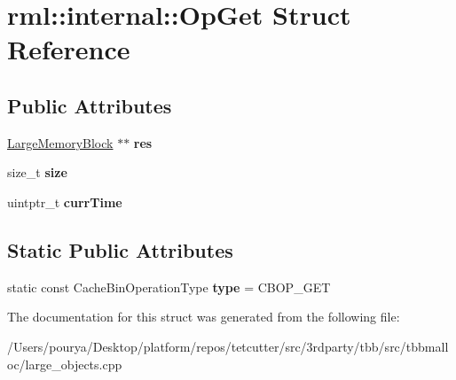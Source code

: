 \hypertarget{structrml_1_1internal_1_1OpGet}{}\section{rml\+:\+:internal\+:\+:Op\+Get Struct Reference}
\label{structrml_1_1internal_1_1OpGet}
\subsection*{Public Attributes}
\begin{DoxyCompactItemize}
\item 
\hypertarget{structrml_1_1internal_1_1OpGet_a28900220e993772d0903734d563a1f3b}{}\hyperlink{structrml_1_1internal_1_1LargeMemoryBlock}{Large\+Memory\+Block} $\ast$$\ast$ {\bfseries res}\label{structrml_1_1internal_1_1OpGet_a28900220e993772d0903734d563a1f3b}

\item 
\hypertarget{structrml_1_1internal_1_1OpGet_a945bece83e743a49829ae81200704df7}{}size\+\_\+t {\bfseries size}\label{structrml_1_1internal_1_1OpGet_a945bece83e743a49829ae81200704df7}

\item 
\hypertarget{structrml_1_1internal_1_1OpGet_a11c9a90f605147ad0c32ef806596e340}{}uintptr\+\_\+t {\bfseries curr\+Time}\label{structrml_1_1internal_1_1OpGet_a11c9a90f605147ad0c32ef806596e340}

\end{DoxyCompactItemize}
\subsection*{Static Public Attributes}
\begin{DoxyCompactItemize}
\item 
\hypertarget{structrml_1_1internal_1_1OpGet_a28040d27682207b9fd319a5cef0e0d8e}{}static const Cache\+Bin\+Operation\+Type {\bfseries type} = C\+B\+O\+P\+\_\+\+G\+E\+T\label{structrml_1_1internal_1_1OpGet_a28040d27682207b9fd319a5cef0e0d8e}

\end{DoxyCompactItemize}


The documentation for this struct was generated from the following file\+:\begin{DoxyCompactItemize}
\item 
/\+Users/pourya/\+Desktop/platform/repos/tetcutter/src/3rdparty/tbb/src/tbbmalloc/large\+\_\+objects.\+cpp\end{DoxyCompactItemize}
